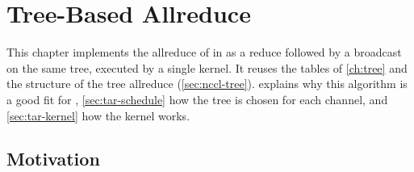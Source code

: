 
\newcommand{\binerot}[2]{%
  \begin{tikzpicture}[baseline=(lab.north), x=0.85cm, y=0.75cm,
      rank/.style={circle, draw, minimum size=0.55cm, inner sep=0pt,
                   fill=white, font=\scriptsize},
      e/.style={-{Stealth[length=2mm]}, line width=1.2pt, black!45,
                shorten >=1pt, shorten <=1pt}]
    \useasboundingbox (-1.8,0.5) rectangle (2.7,-4.5);
    \foreach \i/\px/\py in {0/0.7/0, 3/-0.6/-1.1, 7/0.9/-1.1, 1/2.1/-1.1,
                            4/-1.3/-2.2, 2/-0.1/-2.2, 6/0.9/-2.2, 5/-1.3/-3.3} {
      \pgfmathtruncatemacro{\rk}{mod(\i+#1,8)}
      \node[rank] (n\i) at (\px,\py) {\rk};
    }
    \foreach \a/\b in {0/3,0/7,0/1,3/4,3/2,7/6,4/5} \draw[e] (n\a) -- (n\b);
    \pgfmathtruncatemacro{\rt}{mod(#1,8)}
    \node[rank, draw=crosslink, fill=crosslink!20, thick] at (n0) {\rt};
    \node[font=\footnotesize, align=center] (lab) at (0.45,-4.1) {#2};
  \end{tikzpicture}%
}

\chapter{Tree-Based Allreduce}\label{ch:treeallreduce}
This chapter implements the allreduce of \bine{} in \nccl{} as a reduce followed by a broadcast on the same \bine{} tree, executed by a single kernel.
It reuses the tables of \cref{ch:tree} and the structure of the \nccl{} tree allreduce (\cref{sec:nccl-tree}).
 explains why this algorithm is a good fit for \nccl{}, \cref{sec:tar-schedule} how the tree is chosen for each channel, and \cref{sec:tar-kernel} how the kernel works.
\section{Motivation}\label{sec:tar-motivation}
